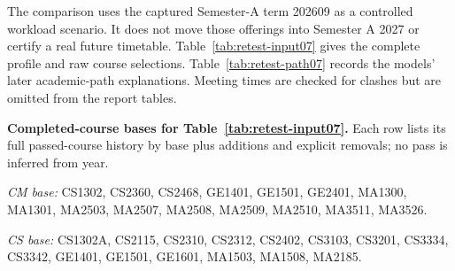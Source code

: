 \documentclass{article}
\begin{document}
The comparison uses the captured Semester-A term 202609 as a controlled workload scenario. It does not move those offerings into Semester A 2027 or certify a real future timetable. Table~\ref{tab:retest-input07} gives the complete profile and raw course selections. Table~\ref{tab:retest-path07} records the models' later academic-path explanations. Meeting times are checked for clashes but are omitted from the report tables.

\textbf{Completed-course bases for Table~\ref{tab:retest-input07}.} Each row lists its full passed-course history by base plus additions and explicit removals; no pass is inferred from year. 

\textit{CM base:} CS1302, CS2360, CS2468, GE1401, GE1501, GE2401, MA1300, MA1301, MA2503, MA2507, MA2508, MA2509, MA2510, MA3511, MA3526.

\textit{CS base:} CS1302A, CS2115, CS2310, CS2312, CS2402, CS3103, CS3201, CS3334, CS3342, GE1401, GE1501, GE1601, MA1503, MA1508, MA2185.
\end{document}
